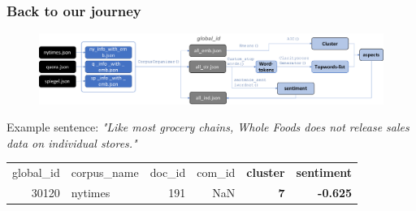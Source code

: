 \documentclass{tum-presentation}
\begin{document}
\begin{frame}
  \frametitle{Back to our journey}
    
  \begin{figure}[t]
    \includegraphics[width = \textwidth]{figures/journey.pdf}
    \end{figure}

    Example sentence: \textit{"Like most grocery chains, Whole Foods does not release sales data on individual stores."}
\\[2ex]
  \begin{tabular}{|r|l|r|r|r|r|}
    global\_id & corpus\_name &  doc\_id &  com\_id &  \textbf{cluster} &  \textbf{sentiment} \\
   
    30120 &     nytimes &     191 &     NaN &        \textbf{7} &     \textbf{-0.625} \\
    \end{tabular}

    
\end{frame}
\end{document}
